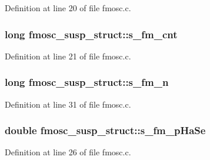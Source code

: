 Definition at line 20 of file fmosc.\+c.

\subsubsection[{\texorpdfstring{s\+\_\+fm\+\_\+cnt}{s_fm_cnt}}]{\setlength{\rightskip}{0pt plus 5cm}long fmosc\+\_\+susp\+\_\+struct\+::s\+\_\+fm\+\_\+cnt}\hypertarget{structfmosc__susp__struct_a7eccc72b1004de4dcebc4a09930df208}{}\label{structfmosc__susp__struct_a7eccc72b1004de4dcebc4a09930df208}


Definition at line 21 of file fmosc.\+c.

\subsubsection[{\texorpdfstring{s\+\_\+fm\+\_\+n}{s_fm_n}}]{\setlength{\rightskip}{0pt plus 5cm}long fmosc\+\_\+susp\+\_\+struct\+::s\+\_\+fm\+\_\+n}\hypertarget{structfmosc__susp__struct_ac8f55db77ab702897c668a97edf76634}{}\label{structfmosc__susp__struct_ac8f55db77ab702897c668a97edf76634}


Definition at line 31 of file fmosc.\+c.

\subsubsection[{\texorpdfstring{s\+\_\+fm\+\_\+p\+Ha\+Se}{s_fm_pHaSe}}]{\setlength{\rightskip}{0pt plus 5cm}double fmosc\+\_\+susp\+\_\+struct\+::s\+\_\+fm\+\_\+p\+Ha\+Se}\hypertarget{structfmosc__susp__struct_a8f6ae27868a9029693facc9d1369d1ce}{}\label{structfmosc__susp__struct_a8f6ae27868a9029693facc9d1369d1ce}


Definition at line 26 of file fmosc.\+c.


